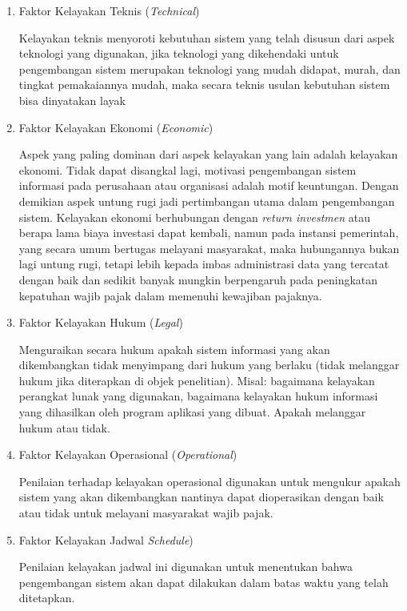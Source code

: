 \documentclass[pdftex,12pt, oneside]{article}
\begin{document}
\begin{enumerate}
	\item Faktor Kelayakan Teknis (\textit{Technical})
	
Kelayakan teknis menyoroti kebutuhan sistem yang telah disusun dari aspek teknologi yang digunakan, jika teknologi yang dikehendaki untuk pengembangan sistem merupakan teknologi yang mudah didapat, murah, dan tingkat pemakaiannya mudah, maka secara teknis usulan kebutuhan sistem bisa dinyatakan layak	
	
	\item Faktor Kelayakan Ekonomi (\textit{Economic})
	
Aspek yang paling dominan dari aspek kelayakan yang lain adalah kelayakan ekonomi. Tidak dapat disangkal lagi, motivasi pengembangan sistem informasi pada perusahaan atau organisasi adalah motif keuntungan. Dengan demikian aspek untung rugi jadi pertimbangan utama dalam pengembangan sistem. Kelayakan ekonomi berhubungan dengan \textit{return investmen} atau berapa lama biaya investasi dapat kembali, namun pada instansi pemerintah, yang secara umum bertugas melayani masyarakat, maka hubungannya bukan lagi untung rugi, tetapi lebih kepada imbas administrasi data yang tercatat dengan baik dan sedikit banyak mungkin berpengaruh pada peningkatan kepatuhan wajib pajak dalam memenuhi kewajiban pajaknya.	

	
	\item Faktor Kelayakan Hukum (\textit{Legal})
	
Menguraikan secara hukum apakah sistem informasi yang akan dikembangkan tidak menyimpang dari hukum yang berlaku (tidak melanggar hukum jika diterapkan di objek penelitian). Misal: bagaimana kelayakan perangkat lunak yang digunakan, bagaimana kelayakan hukum informasi yang dihasilkan oleh program aplikasi yang dibuat. Apakah melanggar hukum atau tidak.	
	
	\item Faktor Kelayakan Operasional (\textit{Operational})

Penilaian terhadap kelayakan operasional digunakan untuk mengukur apakah sistem yang akan dikembangkan nantinya dapat dioperasikan dengan baik atau tidak untuk melayani masyarakat wajib pajak.	
	
	\item Faktor Kelayakan Jadwal \textit{Schedule})
	
Penilaian kelayakan jadwal ini digunakan untuk menentukan bahwa pengembangan sistem akan dapat dilakukan dalam batas waktu yang telah ditetapkan.	
	
\end{enumerate}
\end{document}

